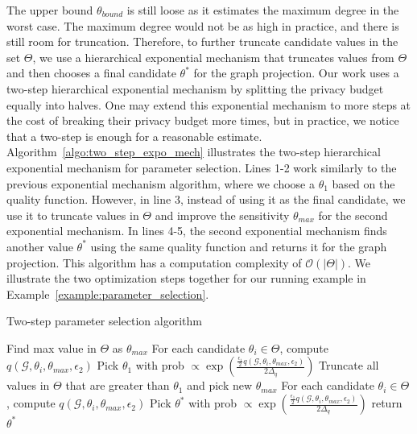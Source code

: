 The upper bound $\theta_{bound}$ is still loose as it estimates the maximum degree in the worst case. The maximum degree would not be as high in practice, and there is still room for truncation. Therefore, to further truncate candidate values in the set $\Theta$, we use a hierarchical exponential mechanism that truncates values from $\Theta$ and then chooses a final candidate $\theta^*$ for the graph projection. Our work uses a two-step hierarchical exponential mechanism by splitting the privacy budget equally into halves. One may extend this exponential mechanism to more steps at the cost of breaking their privacy budget more times, but in practice, we notice that a two-step is enough for a reasonable estimate. Algorithm~\ref{algo:two_step_expo_mech} illustrates the two-step hierarchical exponential mechanism for parameter selection. Lines 1-2 work similarly to the previous exponential mechanism algorithm, where we choose a $\theta_1$ based on the quality function. However, in line 3, instead of using it as the final candidate, we use it to truncate values in $\Theta$ and improve the sensitivity $\theta_{max}$ for the second exponential mechanism. In lines 4-5, the second exponential mechanism finds another value $\theta^*$ using the same quality function and returns it for the graph projection.  This algorithm has a computation complexity of $\mathcal{O}(|\Theta|)$. We illustrate the two optimization steps together for our running example in Example~\ref{example:parameter_selection}.


\begin{algorithm}
\caption{Two-step parameter selection algorithm}
\label{algo:two_step_expo_mech}
    Find max value in $\Theta$ as $\theta_{max}$
    For each candidate $\theta_i \in \Theta$, compute $q(\mathcal{G}, \theta_i, \theta_{max},  \epsilon_2)$ \;
    Pick $\theta_1$ with prob $\propto \exp( \frac{\frac{\epsilon_1}{2} q(\mathcal{G}, \theta_i, \theta_{max}, \epsilon_2)}{2\Delta_q})$\;
    Truncate all values in $\Theta$ that are greater than $\theta_1$ and pick new $\theta_{max}$\;
    For each candidate $\theta_i \in \Theta$, compute $q(\mathcal{G}, \theta_i, \theta_{max},  \epsilon_2)$ \;
    Pick $\theta^*$ with prob $\propto \exp( \frac{\frac{\epsilon_1}{2} q(\mathcal{G}, \theta_i, \theta_{max}, \epsilon_2)}{2\Delta_q})$\;
    return $\theta^*$\;
\end{algorithm}

